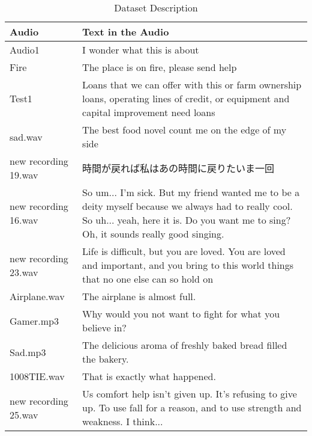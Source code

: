 \documentclass[a4j, twocolumn]{article}
\begin{document}
 \begin{table}[htbp]
\caption{Dataset Description}
\label{tab:dataset_table}
\centering
\renewcommand{\arraystretch}{1.2} %
\setlength{\tabcolsep}{5pt} %
\begin{tabular}{|p{2cm}|p{4cm}|} %
    \hline
    \textbf{Audio} & \textbf{Text in the Audio} \\ \hline
    Audio1 & I wonder what this is about \\ \hline
    Fire & The place is on fire, please send help \\ \hline
    Test1 & Loans that we can offer with this or farm ownership loans, operating lines of credit, or equipment and capital improvement need loans \\ \hline
    sad.wav & The best food novel count me on the edge of my side \\ \hline
    new recording 19.wav & 時間が戻れば私はあの時間に戻りたいま一回 \\ \hline
    new recording 16.wav & So um... I'm sick. But my friend wanted me to be a deity myself because we always had to really cool. So uh... yeah, here it is. Do you want me to sing? Oh, it sounds really good singing. \\ \hline
    new recording 23.wav & Life is difficult, but you are loved. You are loved and important, and you bring to this world things that no one else can so hold on \\ \hline
    Airplane.wav & The airplane is almost full. \\ \hline
    Gamer.mp3 & Why would you not want to fight for what you believe in? \\ \hline
    Sad.mp3 & The delicious aroma of freshly baked bread filled the bakery. \\ \hline
    1008TIE.wav & That is exactly what happened. \\ \hline
    new recording 25.wav & Us comfort help isn’t given up. It’s refusing to give up. To use fall for a reason, and to use strength and weakness. I think... \\ \hline
\end{tabular}
\end{table}
\end{document}
